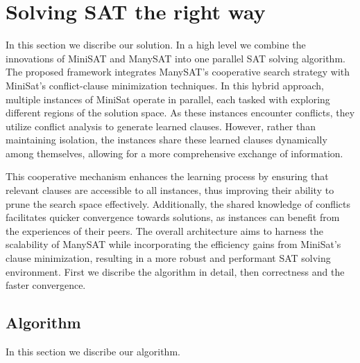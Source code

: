 \documentclass{article}
\begin{document}
\section{Solving SAT the right way}
\label{sec:methodology}

In this section we discribe our solution. In a high level we combine the innovations of MiniSAT \cite{MiniSAT} and ManySAT \cite{ManySAT} into one parallel SAT solving algorithm. The proposed framework integrates ManySAT's cooperative search strategy with MiniSat's conflict-clause minimization techniques. In this hybrid approach, multiple instances of MiniSat operate in parallel, each tasked with exploring different regions of the solution space. As these instances encounter conflicts, they utilize conflict analysis to generate learned clauses. However, rather than maintaining isolation, the instances share these learned clauses dynamically among themselves, allowing for a more comprehensive exchange of information.

This cooperative mechanism enhances the learning process by ensuring that relevant clauses are accessible to all instances, thus improving their ability to prune the search space effectively. Additionally, the shared knowledge of conflicts facilitates quicker convergence towards solutions, as instances can benefit from the experiences of their peers. The overall architecture aims to harness the scalability of ManySAT while incorporating the efficiency gains from MiniSat's clause minimization, resulting in a more robust and performant SAT solving environment. First we discribe the algorithm in detail, then correctness and the faster convergence.

\subsection{Algorithm}
In this section we discribe our algorithm.
\end{document}
